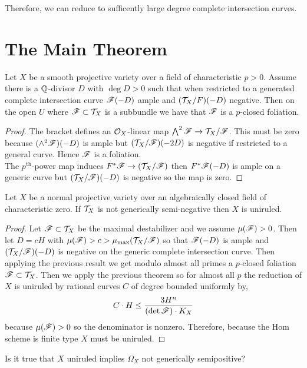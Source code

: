 \documentclass[12pt]{article}
\begin{document}
Therefore, we can reduce to sufficently large degree complete intersection curves.


\section{The Main Theorem}

\begin{prop}
Let $X$ be a smooth projective variety over a field of characteristic $p > 0$. Assume there is a $\mathbb{Q}$-divisor $D$ with $\deg{D} > 0$ such that when restricted to a generated complete intersection curve $\mathscr{F}(-D)$ ample and $(\mathcal{T}_X/F)(-D)$ negative. Then on the open $U$ where $\mathscr{F} \subset \mathcal{T}_X$ is a subbundle we have that $\mathscr{F}$ is a $p$-closed foliation.
\end{prop}

\begin{proof}
The bracket defines an $\mathcal{O}_{X}$-linear map $\bigwedge^2 \mathscr{F} \to \mathcal{T}_X / \mathscr{F}$. This must be zero because $(\wedge^2 \mathscr{F})(-D)$ is ample but $(\mathcal{T}_X/\mathscr{F})(-2D)$ is negative if restricted to a general curve. Hence $\mathscr{F}$ is a foliation. 
\bigskip\\
The $p^{\text{th}}$-power map induces $F^* \mathscr{F} \to (\mathcal{T}_X / \mathscr{F})$ then $F^* \mathscr{F}(-D)$ is ample on a generic curve but $(\mathcal{T}_X/\mathscr{F})(-D)$ is negative so the map is zero. 
\end{proof}


\begin{theorem}
Let $X$ be a normal projective variety over an algebraically closed field of characteristic zero. If $\mathcal{T}_X$ is not generically semi-negative then $X$ is uniruled.
\end{theorem}

\begin{proof}
Let $\mathscr{F} \subset \mathcal{T}_X$ be the maximal destabilizer and we assume $\mu(\mathscr{F}) > 0$. Then let $D = c H$ with $\mu(\mathscr{F}) > c > \mu_{\max}(\mathcal{T}_X/\mathscr{F})$ so that $\mathscr{F}(-D)$ is ample and $(\mathcal{T}_X/\mathscr{F})(-D)$ is negative on the generic complete intersection curve. Then applying the previous result we get modulo almost all primes a $p$-closed foliation $\mathscr{F} \subset \mathcal{T}_X$. Then we apply the previous theorem so for almost all $p$ the reduction of $X$ is uniruled by rational curves $C$ of degree bounded uniformly by,
\[ C \cdot H \le \frac{3 H^n}{(\det{\mathscr{F}}) \cdot K_X} \]
because $\mu(\mathscr{F}) > 0$ so the denominator is nonzero. Therefore, because the Hom scheme is finite type $X$ must be uniruled.
\end{proof}

{\color{red} Is it true that $X$ uniruled implies $\Omega_X$ not generically semipositive?}
\end{document}
